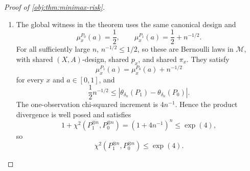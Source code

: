 \begin{proof}[Proof of \cref{obj:thm:minimax-risk}]
\begin{enumerate}
\[\qquad
\mu_x^{Q_{\mathrm{low},1}}(a)=\frac12+
 a_{\mathrm{low}}(\tau_{\mathrm{low}}h_n)^\beta
 b_\circ\!\left(\frac{a-\delta_n}{\tau_{\mathrm{low}}h_n}\right)
\]
on the same canonical design.  For all sufficiently large \(n\),
\cref{obj:lem:bandwidth-balance} gives
\[
0<h_n,
\qquad
h_n\le1-\bar\delta,
\qquad
n h_n^{2\beta+1}(\delta_n+h_n)^\kappa=1 .
\]
Together with \(\delta_n\in[0,\bar\delta]\), this gives \(\delta_n\in[0,1]\),
\(0<\tau_{\mathrm{low}}h_n\le h_n\le1\), and \(\delta_n+h_n\le1\).  The displayed
Taylor bound places both laws in \(\mathcal M\).  The target separation obeys
\[
a_{\mathrm{low}}\delta_n^{\kappa+1}(\tau_{\mathrm{low}}h_n)^\beta
\le
\left|
\theta_{\delta_n}(Q_{\mathrm{low},1})
-
\theta_{\delta_n}(Q_{\mathrm{low},0})
\right|.
\]
The one-observation chi-squared increment satisfies
\[
\int 4a_{\mathrm{low}}^2(\tau_{\mathrm{low}}h_n)^{2\beta}
 b_\circ\!\left(\frac{a-\delta_n}{\tau_{\mathrm{low}}h_n}\right)^2
\,dP_{X,A}(x,a)
\le
8(\kappa+1)a_{\mathrm{low}}^2
(\tau_{\mathrm{low}}h_n)^{2\beta+1}(\delta_n+\tau_{\mathrm{low}}h_n)^\kappa .
\]
Using the balance identity above, \(\tau_{\mathrm{low}}h_n\le h_n\), and \(\kappa\ge0\),
\[
n\int 4a_{\mathrm{low}}^2(\tau_{\mathrm{low}}h_n)^{2\beta}
 b_\circ\!\left(\frac{a-\delta_n}{\tau_{\mathrm{low}}h_n}\right)^2
\,dP_{X,A}(x,a)
\le
\zeta_{\mathrm{low}}\tau_{\mathrm{low}}^{2\beta+1}
\le1 .
\]
Let
\[
I_{\mathrm{low},n}
=
\int 4a_{\mathrm{low}}^2(\tau_{\mathrm{low}}h_n)^{2\beta}
 b_\circ\!\left(\frac{a-\delta_n}{\tau_{\mathrm{low}}h_n}\right)^2
\,dP_{X,A}(x,a)
\]
be the one-observation chi-squared increment for this Bernoulli perturbation.  The product law factorization gives
\[
1+\chi^2(Q_{\mathrm{low},1}^{\otimes n},Q_{\mathrm{low},0}^{\otimes n})
=
(1+I_{\mathrm{low},n})^n .
\]
Since \(I_{\mathrm{low},n}\ge0\) and \(nI_{\mathrm{low},n}\le1\), the inequality \(1+u\le e^u\) yields
\[
\chi^2(Q_{\mathrm{low},1}^{\otimes n},Q_{\mathrm{low},0}^{\otimes n})
\le
\exp(nI_{\mathrm{low},n})-1
\le e-1<4 .
\]
Applying the two-point bound gives a constant \(c_{\mathrm{loc}}>0\) such that
\[
c_{\mathrm{loc}}\delta_n^{\kappa+1}h_n^\beta
\le
R_n^\star
\]
for every admissible \((\delta_n)\) and all sufficiently large \(n\).

\item The global witness in the theorem uses the same canonical design and
\[
\mu_x^{P_0}(a)=\frac12,
\qquad
\mu_x^{P_1}(a)=\frac12+n^{-1/2}.
\]
For all sufficiently large \(n\), \(n^{-1/2}\le1/2\), so these are Bernoulli laws in
\(\mathcal M\), with shared \((X,A)\)-design, shared \(p_x\), and shared \(\pi_x\).
They satisfy
\[
\mu_x^{P_1}(a)=\mu_x^{P_0}(a)+n^{-1/2}
\]
for every \(x\) and \(a\in[0,1]\), and
\[
\frac12 n^{-1/2}
\le
\left|
\theta_{\delta_n}(P_1)-\theta_{\delta_n}(P_0)
\right|.
\]
The one-observation chi-squared increment is \(4n^{-1}\).  Hence the product divergence is
well posed and satisfies
\[
1+\chi^2(P_1^{\otimes n},P_0^{\otimes n})
=
(1+4n^{-1})^n
\le
\exp(4),
\]
so
\[
\chi^2(P_1^{\otimes n},P_0^{\otimes n})
\le
\exp(4).
\]


\end{enumerate}
\end{proof}
